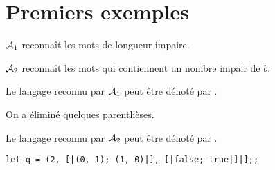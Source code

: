 \section{Premiers exemples}
\begin{Exercise}
${\cal A}_1$ reconnaît les mots de longueur impaire.
\end{Exercise}
\begin{Exercise}
${\cal A}_2$ reconnaît les mots qui contiennent un nombre impair de $b$.
\end{Exercise}
\begin{Exercise}
Le langage reconnu par ${\cal A}_1$ peut être dénoté par .

On a éliminé quelques parenthèses.
\end{Exercise}
\begin{Exercise}
Le langage reconnu par ${\cal A}_2$ peut être dénoté par .
\end{Exercise}
\begin{Exercise}
\begin{lstlisting}
let q = (2, [|(0, 1); (1, 0)|], [|false; true|]|];; 
\end{lstlisting}
\end{Exercise}
